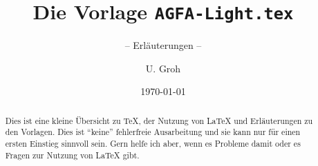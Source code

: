 \documentclass[%
	,ngerman
	,toc			= bib
	,abstract		= true
	,parskip		= half+
	,abstract 		= true
	]{scrartcl}
\title{Die Vorlage \texttt{AGFA-Light.tex}}
\subtitle{-- Erläuterungen --}
\date{\today}
\author{U. Groh}
\begin{document}

\maketitle
\tableofcontents
\thispagestyle{empty}


\begin{abstract}
Dies ist eine kleine Übersicht zu \TeX{}, der Nutzung von \LaTeX{} und Erläuterungen zu den Vorlagen.
Dies ist \enquote{keine} fehlerfreie Ausarbeitung und sie kann nur für einen ersten Einstieg sinnvoll sein.
Gern helfe ich aber, wenn es Probleme damit oder es Fragen zur Nutzung von \LaTeX{} gibt.
\end{abstract}



\nocite{voss:2012a,lamport:1986}
\printbibliography
%
\end{document}
